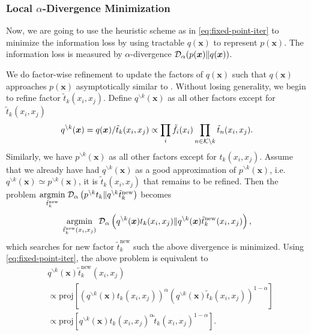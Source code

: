 \documentclass{article}
\begin{document}
\subsubsection{Local $\alpha$-Divergence Minimization}

Now, we are going to use the heuristic scheme as in \autoref{eq:fixed-point-iter} to minimize the information loss by using tractable $q(\bm{x})$ to represent $p(\bm{x})$. The information loss is measured by $\alpha$-divergence $\mathcal{D}_{\alpha}(p(\bm{x}) \| q(\bm{x}))$.

We do factor-wise refinement to update the factors of $q(\bm{x})$ such that $q(\bm{x})$ approaches $p(\bm{x})$ asymptotically similar to \cite{divergence-measures-and-message-passing,Minka:2001:EPA:647235.720257}. Without losing generality, we begin to refine factor $\tilde{t}_k(x_i, x_j)$. Define $q^{\backslash k}(\bm{x})$ as all other factors except for $\tilde{t}_k(x_i, x_j)$
\begin{equation}
  q^{\backslash k}(\bm{x}) = q(\bm{x})/\tilde{t}_k(x_i, x_j) \propto \prod_{{i}} \tilde{f}_i(x_i) \prod_{n\in \mathcal{K} \backslash k} \tilde{t}_n(x_i, x_j).
\end{equation}
Similarly, we have $p^{\backslash k}(\bm{x})$ as all other factors except for $t_k(x_i, x_j)$. Assume that we already have had $q^{\backslash k}(\bm{x})$ as a good approximation of $p^{\backslash k}(\bm{x})$, i.e. $q^{\backslash k}(\bm{x}) \simeq p^{\backslash k}(\bm{x})$, it is $\tilde{t}_k(x_i, x_j)$ that remains to be refined. 
Then the problem $\underset{\tilde{t}_k^{\text{new}}}{\operatorname{argmin}}\; \mathcal{D}_{\alpha}\left(  p^{\backslash k}t_k\|q^{\backslash k}\tilde{t}_k^{\text{new}}\right)$ becomes \vspace{-0.3cm}
\begin{equation}
  \underset{\tilde{t}_k^{\text{new}}(x_i, x_j)}{\operatorname{argmin}}\; \mathcal{D}_{\alpha}\left(  q^{\backslash k}(\bm{x}) t_k(x_i, x_j)\|q^{\backslash k}(\bm{x}) \tilde{t}_k^{\text{new}}(x_i, x_j) \right),
\end{equation}
which searches for new factor $\tilde{t}_k^{\text{new}}$ such the above divergence is minimized.
Using \autoref{eq:fixed-point-iter}, the above problem is equivalent to
\begin{align}\label{eq:update-rule}
  &q^{\backslash k}(\bm{x}) \tilde{t}_k^{\text{new}}(x_i, x_j) \nonumber\\
  &\propto \text{proj}\left[ \left(q^{\backslash k}(\bm{x}) t_k(x_i, x_j)  \right)^{\alpha} \left(q^{\backslash k}(\bm{x}) \tilde{t}_k(x_i, x_j)  \right)^{1-\alpha} \right] \nonumber \\
  & \propto \text{proj}\left[ q^{\backslash k}(\bm{x}) t_k(x_i, x_j)^{\alpha} \tilde{t}_k(x_i, x_j)^{1-\alpha} \right].
\end{align}
\end{document}
